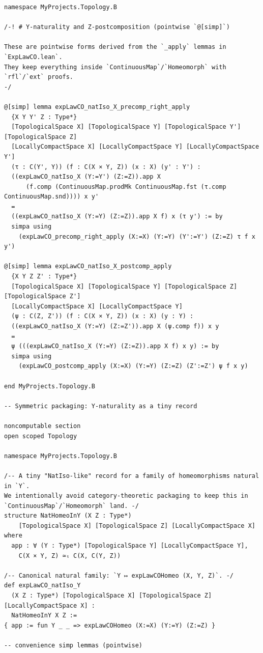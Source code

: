 \documentclass[12pt]{article}
\begin{document}
\begin{lstlisting}
namespace MyProjects.Topology.B

/-! # Y-naturality and Z-postcomposition (pointwise `@[simp]`)

These are pointwise forms derived from the `_apply` lemmas in `ExpLawCO.lean`.
They keep everything inside `ContinuousMap`/`Homeomorph` with `rfl`/`ext` proofs.
-/

@[simp] lemma expLawCO_natIso_X_precomp_right_apply
  {X Y Y' Z : Type*}
  [TopologicalSpace X] [TopologicalSpace Y] [TopologicalSpace Y'] [TopologicalSpace Z]
  [LocallyCompactSpace X] [LocallyCompactSpace Y] [LocallyCompactSpace Y']
  (τ : C(Y', Y)) (f : C(X × Y, Z)) (x : X) (y' : Y') :
  ((expLawCO_natIso_X (Y:=Y') (Z:=Z)).app X
      (f.comp (ContinuousMap.prodMk ContinuousMap.fst (τ.comp ContinuousMap.snd)))) x y'
  =
  ((expLawCO_natIso_X (Y:=Y) (Z:=Z)).app X f) x (τ y') := by
  simpa using
    (expLawCO_precomp_right_apply (X:=X) (Y:=Y) (Y':=Y') (Z:=Z) τ f x y')

@[simp] lemma expLawCO_natIso_X_postcomp_apply
  {X Y Z Z' : Type*}
  [TopologicalSpace X] [TopologicalSpace Y] [TopologicalSpace Z] [TopologicalSpace Z']
  [LocallyCompactSpace X] [LocallyCompactSpace Y]
  (ψ : C(Z, Z')) (f : C(X × Y, Z)) (x : X) (y : Y) :
  ((expLawCO_natIso_X (Y:=Y) (Z:=Z')).app X (ψ.comp f)) x y
  =
  ψ (((expLawCO_natIso_X (Y:=Y) (Z:=Z)).app X f) x y) := by
  simpa using
    (expLawCO_postcomp_apply (X:=X) (Y:=Y) (Z:=Z) (Z':=Z') ψ f x y)

end MyProjects.Topology.B

-- Symmetric packaging: Y‑naturality as a tiny record

noncomputable section
open scoped Topology

namespace MyProjects.Topology.B

/-- A tiny "NatIso-like" record for a family of homeomorphisms natural in `Y`.
We intentionally avoid category-theoretic packaging to keep this in
`ContinuousMap`/`Homeomorph` land. -/
structure NatHomeoInY (X Z : Type*)
    [TopologicalSpace X] [TopologicalSpace Z] [LocallyCompactSpace X] where
  app : ∀ (Y : Type*) [TopologicalSpace Y] [LocallyCompactSpace Y],
    C(X × Y, Z) ≃ₜ C(X, C(Y, Z))

/-- Canonical natural family: `Y ↦ expLawCOHomeo (X, Y, Z)`. -/
def expLawCO_natIso_Y
  (X Z : Type*) [TopologicalSpace X] [TopologicalSpace Z] [LocallyCompactSpace X] :
  NatHomeoInY X Z :=
{ app := fun Y _ _ => expLawCOHomeo (X:=X) (Y:=Y) (Z:=Z) }

-- convenience simp lemmas (pointwise)


\end{lstlisting}
\end{document}
